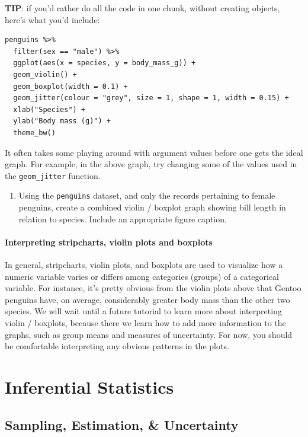 \documentclass[
]{book}
\providecommand{\tightlist}{%
  \setlength{\itemsep}{0pt}\setlength{\parskip}{0pt}}
\begin{document}
\textbf{TIP}: if you'd rather do all the code in one chunk, without creating objects, here's what you'd include:

\begin{verbatim}
penguins %>% 
  filter(sex == "male") %>%
  ggplot(aes(x = species, y = body_mass_g)) +
  geom_violin() +
  geom_boxplot(width = 0.1) + 
  geom_jitter(colour = "grey", size = 1, shape = 1, width = 0.15) +
  xlab("Species") +
  ylab("Body mass (g)") +
  theme_bw()
\end{verbatim}

It often takes some playing around with argument values before one gets the ideal graph. For example, in the above graph, try changing some of the values used in the \texttt{geom\_jitter} function.

\begin{enumerate}
\def\labelenumi{\arabic{enumi}.}
\tightlist
\item
  Using the \texttt{penguins} dataset, and only the records pertaining to female penguins, create a combined violin / boxplot graph showing bill length in relation to species. Include an appropriate figure caption.
\end{enumerate}

\subsection{Interpreting stripcharts, violin plots and boxplots}\label{interp_violin}

In general, stripcharts, violin plots, and boxplots are used to visualize how a numeric variable varies or differs among categories (groups) of a categorical variable. For instance, it's pretty obvious from the violin plots above that Gentoo penguins have, on average, considerably greater body mass than the other two species. We will wait until a future tutorial to learn more about interpreting violin / boxplots, because there we learn how to add more information to the graphs, such as group means and measures of uncertainty. For now, you should be comfortable interpreting any obvious patterns in the plots.

\part*{Inferential Statistics}\label{part-inferential-statistics}

\chapter{Sampling, Estimation, \& Uncertainty}\label{estimation}
\end{document}

